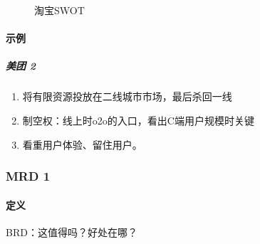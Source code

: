 \documentclass[letterpaper,11pt,english]{sphinxmanual}
\begin{document}
\begin{figure}[H]
\centering
\capstart

\noindent{}
\caption{淘宝SWOT\sphinxfootnotemark[480]}\label{\detokenize{chapter_knowledge/compete_analysis:id10}}\end{figure}
%
\begin{footnotetext}[480]\sphinxAtStartFootnote
{}
%
\end{footnotetext}\ignorespaces 

\paragraph{示例}
\label{\detokenize{chapter_knowledge/compete_analysis:id8}}

\subparagraph{美团 2\sphinxfootnotemark[481]}
\label{\detokenize{chapter_knowledge/compete_analysis:id9}}%
\begin{footnotetext}[481]\sphinxAtStartFootnote
{}
%
\end{footnotetext}\ignorespaces \begin{enumerate}
%
\item {} 
将有限资源投放在二线城市市场，最后杀回一线

\item {} 
制空权：线上时o2o的入口，看出C端用户规模时关键

\item {} 
看重用户体验、留住用户。

\end{enumerate}


\subsubsection{MRD 1\sphinxfootnotemark[482]}
\label{\detokenize{chapter_knowledge/MRD:mrd-1}}\label{\detokenize{chapter_knowledge/MRD::doc}}%
\begin{footnotetext}[482]\sphinxAtStartFootnote
{}
%
\end{footnotetext}\ignorespaces 

\paragraph{定义}
\label{\detokenize{chapter_knowledge/MRD:id1}}
BRD：这值得吗？好处在哪？
\end{document}
